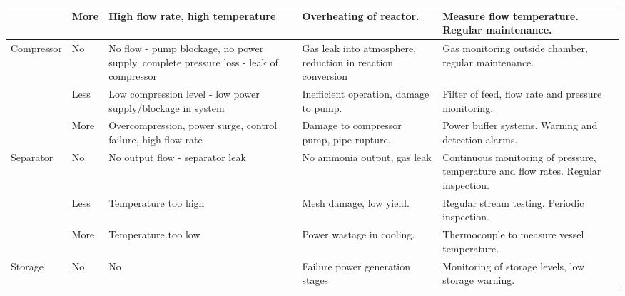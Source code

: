 {{\begin{landscape}
\begin{table}
\begin{tabular}{|p{2.65cm}|p{1.4cm}|p{5.7cm}|p{5.2cm}|p{8.2cm}|}
	\hline
	& More      & High flow rate, high temperature                                                                      & Overheating of reactor.                                  & Measure flow temperature. Regular maintenance.                                                                                  \\ 
	\hline
	Compressor     & No        & No flow - pump blockage, no power supply, complete pressure loss - leak of compressor                 & Gas leak into atmosphere, reduction in reaction conversion               & Gas monitoring outside chamber, regular maintenance.                                                                               \\ 
	\hline
	& Less      & Low compression level - low power supply/blockage in system                                           & Inefficient operation, damage to pump.                                   & Filter of feed, flow rate and pressure monitoring.                                                                                 \\ 
	\hline
	& More      & Overcompression, power surge, control failure, high flow rate                                         & Damage to compressor pump, pipe rupture. & Power buffer systems. Warning and detection alarms.                                                                                \\ 
	\hline
	Separator      & No        & No output flow - separator leak                                                                       & No ammonia output, gas leak                                              & Continuous monitoring of pressure, temperature and flow rates. Regular inspection.                                                 \\ 
	\hline
	& Less      & Temperature too high                                                                                  & Mesh damage, low yield.                                       & Regular stream testing. Periodic inspection.                                                                  \\ 
	\hline
	& More      & Temperature too low                                                                                   & Power wastage in cooling.                                        & Thermocouple to measure vessel temperature.                                                                                 \\ 
	\hline
	Storage        & No        & No~                                                                                                   & Failure power generation stages                         & Monitoring of storage levels, low storage warning.                                                                                 \\ 

\end{tabular}
\end{table}
\end{landscape}}}
